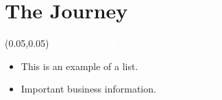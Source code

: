 \documentclass[aspectratio=169]{beamer} %
\begin{document}
\section{The Journey}

\begin{frame}{}
    \setlength{\TPHorizModule}{\textwidth}
    \setlength{\TPVertModule}{\textwidth}
    \begin{textblock}{0.74}(0.05,0.05)
        \bfseries\large\textcolor{white}{What Have I Gotten Myself Into?}
    \end{textblock}
    \begin{itemize}
        \item This is an example of a list.
        \item Important business information.
    \end{itemize}
\end{frame}
\end{document}
